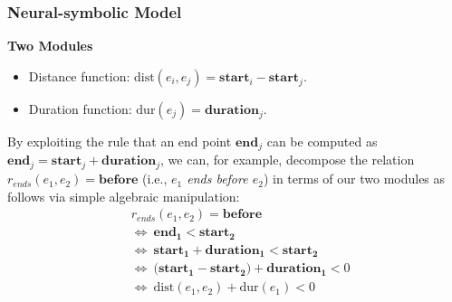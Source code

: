 \documentclass[10pt,aspectratio=43]{beamer}
\begin{document}
    \begin{frame}
        \frametitle{\textbf{Neural-symbolic Model}}
	    \begin{block}{\textbf{Two Modules}}
	        \begin{itemize}
	            \item Distance function: $\mathrm{dist}(e_i, e_j) = \mathbf{start}_{i} - \mathbf{start}_{j}$.
	            \item Duration function: $\mathrm{dur}(e_{j}) = \mathbf{duration}_{j}$.
	        \end{itemize}
	    \end{block}
	    By exploiting the rule that an end point $\mathbf{end}_{j}$ can be computed as $\mathbf{end}_{j} = \mathbf{start}_{j} + \mathbf{duration}_{j}$, we can, for example, decompose the relation $r_{ends}(e_{1},e_{2}) = \textbf{before}$ (i.e., \emph{$e_{1}$ ends before $e_{2}$}) in terms of our two modules as follows via simple algebraic manipulation:
	    \begin{align*}
	        &r_{ends}(e_{1},e_{2}) = \textbf{before} \\
	        &\Leftrightarrow\ \mathbf{end_1} < \mathbf{start_{2}}  \\
	        &\Leftrightarrow\ \mathbf{start_{1}} + \mathbf{duration_{1}} < \mathbf{start_{2}} \\ &\Leftrightarrow\ \big( \mathbf{start_{1}} - \mathbf{start_{2}}\big) + \mathbf{duration_{1}} < 0 \\
	        &\Leftrightarrow\ \mathrm{dist}(e_1, e_2)+ \mathrm{dur}(e_1) < 0
	   \end{align*}
	\end{frame}	
	
\end{document}
